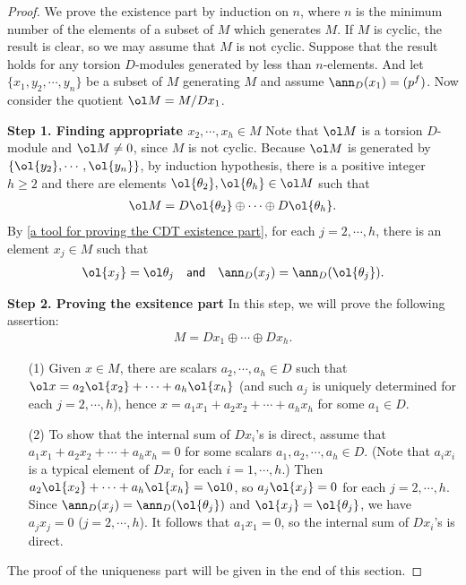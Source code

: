 \begin{proof}
    We prove the existence part by induction on $n$, where $n$ is the minimum number of the elements of a subset of $M$ which generates $M$.
    If $M$ is cyclic, the result is clear, so we may assume that $M$ is not cyclic.
    Suppose that the result holds for any torsion $D$-modules generated by less than $n$-elements.
    And let $\{x_1, y_2, \cdots, y_n\}$ be a subset of $M$ generating $M$ and assume $\ann_D(x_1)=(p^f)$.
    Now consider the quotient $\ol M=M/Dx_1$.

    \textbf{Step 1. Finding appropriate $x_2, \cdots, x_h\in M$}\newline\indent
    Note that $\ol M$ is a torsion $D$-module and $\ol M\neq 0$, since $M$ is not cyclic.
    Because $\ol M$ is generated by $\{\ol{y_2}, \cdots, \ol{y_n}\}$, by induction hypothesis, there is a positive integer $h\geq 2$ and there are elements $\ol{\theta_2}, \ol{\theta_h}\in\ol M$ such that
    \begin{align*}
        \ol M = D\ol{\theta_2} \oplus \cdots \oplus D\ol{\theta_h}.
    \end{align*}
    By \cref{a tool for proving the CDT existence part}, for each $j=2, \cdots, h$, there is an element $x_j\in M$ such that
    \begin{align*}
        \ol{x_j}=\ol\theta_j\quad\textsf{and}\quad\ann_D(x_j)=\ann_D(\ol{\theta_j}).
    \end{align*}

    \textbf{Step 2. Proving the exsitence part}\newline\indent
    In this step, we will prove the following assertion:
    \begin{align*}
        M=Dx_1\oplus\cdots\oplus Dx_h.
    \end{align*}
    \begin{enumerate}
        \item[(1)]
        {
            Given $x\in M$, there are scalars $a_2, \cdots, a_h\in D$ such that $\ol x=a_2\ol{x_2}+\cdots+a_h\ol{x_h}$ (and such $a_j$ is uniquely determined for each $j=2, \cdots, h$), hence $x=a_1x_1+a_2x_2+\cdots+a_hx_h$ for some $a_1\in D$.
        }
        \item[(2)]
        {
            To show that the internal sum of $Dx_i$'s is direct, assume that $a_1x_1+a_2x_2+\cdots+a_hx_h=0$ for some scalars $a_1, a_2, \cdots, a_h\in D$. (Note that $a_i x_i$ is a typical element of $Dx_i$ for each $i=1, \cdots, h$.)
            Then $a_2\ol{x_2}+\cdots+a_h\ol{x_h}=\ol 0$, so $a_j\ol{x_j}=0$ for each $j=2, \cdots, h$.
            Since $\ann_D(x_j)=\ann_D(\ol{\theta_j})$ and $\ol{x_j}=\ol{\theta_j}$, we have $a_j x_j=0$ ($j=2, \cdots, h$).
            It follows that $a_1x_1=0$, so the internal sum of $Dx_i$'s is direct.
        }
    \end{enumerate}

    The proof of the uniqueness part will be given in the end of this section.
\end{proof}
